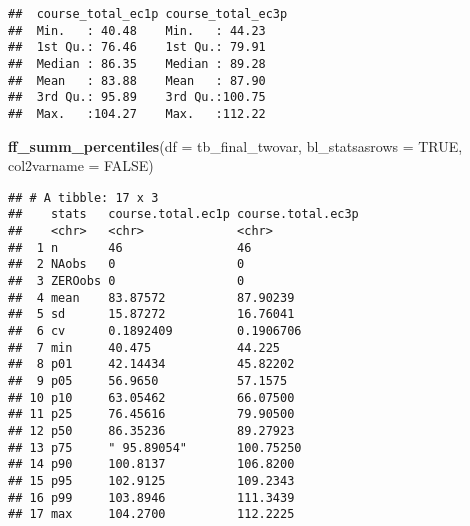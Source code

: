 \documentclass[
]{book}
\newenvironment{Shaded}{\begin{snugshade}}{\end{snugshade}}
\newcommand{\DataTypeTok}[1]{\textcolor[rgb]{0.13,0.29,0.53}{#1}}
\newcommand{\KeywordTok}[1]{\textcolor[rgb]{0.13,0.29,0.53}{\textbf{#1}}}
\newcommand{\NormalTok}[1]{#1}
\newcommand{\OperatorTok}[1]{\textcolor[rgb]{0.81,0.36,0.00}{\textbf{#1}}}
\newcommand{\OtherTok}[1]{\textcolor[rgb]{0.56,0.35,0.01}{#1}}
\newcommand{\StringTok}[1]{\textcolor[rgb]{0.31,0.60,0.02}{#1}}
\begin{document}
\begin{Shaded}
\end{Shaded}

\begin{verbatim}
##  course_total_ec1p course_total_ec3p
##  Min.   : 40.48    Min.   : 44.23   
##  1st Qu.: 76.46    1st Qu.: 79.91   
##  Median : 86.35    Median : 89.28   
##  Mean   : 83.88    Mean   : 87.90   
##  3rd Qu.: 95.89    3rd Qu.:100.75   
##  Max.   :104.27    Max.   :112.22
\end{verbatim}

\begin{Shaded}
\begin{Highlighting}[]
\KeywordTok{ff_summ_percentiles}\NormalTok{(}\DataTypeTok{df =}\NormalTok{ tb_final_twovar, }\DataTypeTok{bl_statsasrows =} \OtherTok{TRUE}\NormalTok{, }\DataTypeTok{col2varname =} \OtherTok{FALSE}\NormalTok{)}
\end{Highlighting}
\end{Shaded}

\begin{verbatim}
## # A tibble: 17 x 3
##    stats   course.total.ec1p course.total.ec3p
##    <chr>   <chr>             <chr>            
##  1 n       46                46               
##  2 NAobs   0                 0                
##  3 ZEROobs 0                 0                
##  4 mean    83.87572          87.90239         
##  5 sd      15.87272          16.76041         
##  6 cv      0.1892409         0.1906706        
##  7 min     40.475            44.225           
##  8 p01     42.14434          45.82202         
##  9 p05     56.9650           57.1575          
## 10 p10     63.05462          66.07500         
## 11 p25     76.45616          79.90500         
## 12 p50     86.35236          89.27923         
## 13 p75     " 95.89054"       100.75250        
## 14 p90     100.8137          106.8200         
## 15 p95     102.9125          109.2343         
## 16 p99     103.8946          111.3439         
## 17 max     104.2700          112.2225
\end{verbatim}
\end{document}

